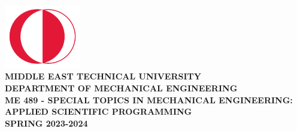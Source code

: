 \begin{titlepage}
   \begin{center}
        \includegraphics[width=0.25\textwidth]{structurals/metu.png} \\
        \vspace*{1cm}
        \Large
        \textbf{MIDDLE EAST TECHNICAL UNIVERSITY} \\
        \vspace{0.05cm}
        \textbf{DEPARTMENT OF MECHANICAL ENGINEERING} \\
        \vspace{2.5cm}
        \textbf{ME 489 - SPECIAL TOPICS IN MECHANICAL ENGINEERING: APPLIED SCIENTIFIC PROGRAMMING} \\
        \vspace{.75cm}
        \textbf{SPRING 2023-2024}\\
        \vspace{2cm}
         \\
        \vspace{5cm}
         \\
        \vspace{.5cm}
         \\

       \vfill
       
       \small
            
       \vspace{0cm}

            
   \end{center}
\end{titlepage}